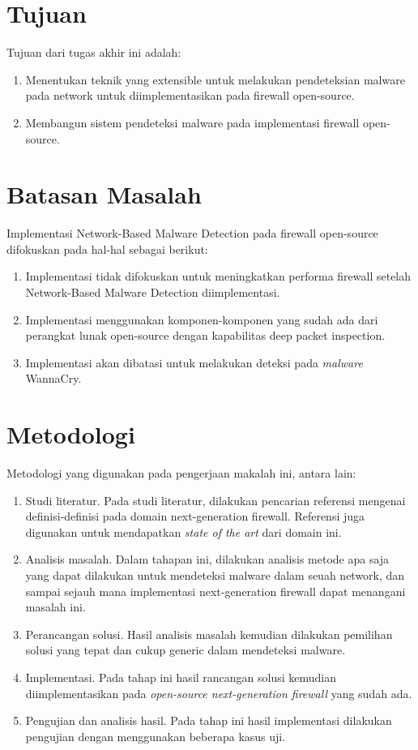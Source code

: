 \section{Tujuan}
Tujuan dari tugas akhir ini adalah:
\begin{enumerate}
	\item Menentukan teknik yang extensible untuk melakukan pendeteksian malware pada network untuk diimplementasikan pada firewall open-source.
	\item Membangun sistem pendeteksi malware pada implementasi firewall open-source.
\end{enumerate}

\section{Batasan Masalah}
Implementasi Network-Based Malware Detection pada firewall open-source
difokuskan pada hal-hal sebagai berikut:
\begin{enumerate}
	\item Implementasi tidak difokuskan untuk meningkatkan performa firewall
	setelah Network-Based Malware Detection diimplementasi.
	\item Implementasi menggunakan komponen-komponen yang sudah ada dari perangkat lunak open-source dengan kapabilitas deep packet inspection.
	\item Implementasi akan dibatasi untuk melakukan deteksi pada \textit{malware} WannaCry.
\end{enumerate}

\section{Metodologi}
Metodologi yang digunakan pada pengerjaan makalah ini, antara lain:
\begin{enumerate}
	\item Studi literatur. Pada studi literatur, dilakukan pencarian referensi mengenai
	definisi-definisi pada domain next-generation firewall. Referensi juga
	digunakan untuk mendapatkan \textit{state of the art} dari domain ini.
	\item Analisis masalah. Dalam tahapan ini, dilakukan analisis metode apa saja
	yang dapat dilakukan untuk mendeteksi malware dalam seuah network, dan sampai sejauh mana implementasi next-generation firewall dapat
	menangani masalah ini.
	\item Perancangan solusi. Hasil analisis masalah kemudian dilakukan pemilihan
	solusi yang tepat dan cukup generic dalam mendeteksi malware.
	\item Implementasi. Pada tahap ini hasil rancangan solusi kemudian
	diimplementasikan pada \textit{open-source next-generation firewall} yang sudah
	ada.
	\item Pengujian dan analisis hasil. Pada tahap ini hasil implementasi dilakukan
	pengujian dengan menggunakan beberapa kasus uji.
\end{enumerate}
